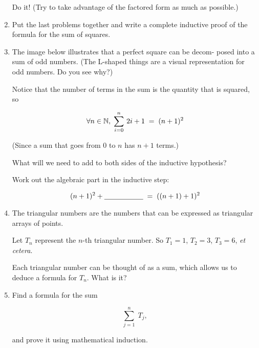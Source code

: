 \documentclass{amsart}
\begin{document}
\begin{enumerate}
\noindent Do it! (Try to take advantage of the factored form as much as
possible.)

\vfill

\newpage

\item Put the last problems together and write a complete inductive proof
of the formula for the sum of squares.

\vfill

\newpage

\item The image below illustrates that a perfect square can be decom-
posed into a sum of odd numbers. (The L-shaped things are a
visual representation for odd numbers.  Do you see why?)
\bigskip

\centerline{  }
\bigskip

Notice that the number of terms in the sum is the quantity that is
squared, so

\[ \forall n \in {\mathbb N}, \; \sum_{i=0}^n \, 2i+1 \; = \; (n+1)^2 \]

\noindent (Since a sum that goes from $0$ to $n$ has $n + 1$ terms.)

\noindent What will we need to add to both sides of the inductive hypothesis?

\vspace{.75in}

Work out the algebraic part in the inductive step:

\[(n + 1)^2 + \underline{\hspace{.75in}} \; = \; ((n + 1) + 1)^2 \] 

\vfill

\newpage

\item The triangular numbers are the numbers that can be expressed as
triangular arrays of points.
\bigskip

\centerline{  }
\bigskip

Let $T_n$ represent the $n$-th triangular number.  So $T_1 = 1$, $T_2 = 3$,
$T_3 = 6$, {\em et cetera}.

Each triangular number can be thought of as a sum, which allows
us to deduce a formula for $T_n$.  What is it?

\vfill

\item Find a formula for the sum

\[ \sum_{j=1}^n \; T_j, \]

\noindent and prove it using mathematical induction.


\end{enumerate}
\end{document}
